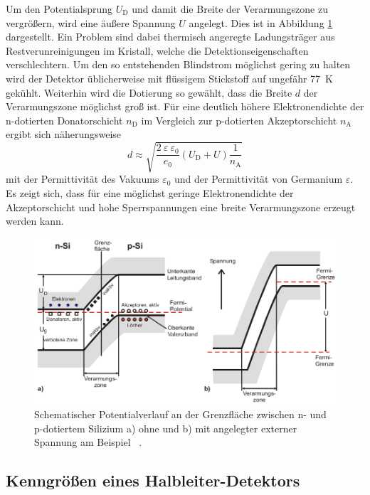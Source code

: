 Um den Potentialsprung $U_\text{D}$ und damit die Breite der Verarmungszone zu vergrößern,
wird eine äußere Spannung $U$ angelegt.
Dies ist in Abbildung \ref{fig:SchematischerPotentialverlauf} dargestellt.
Ein Problem sind dabei thermisch angeregte Ladungsträger aus Restverunreinigungen im Kristall,
welche die Detektionseigenschaften verschlechtern.
Um den so entstehenden Blindstrom möglichst gering zu halten wird der
Detektor üblicherweise mit flüssigem Stickstoff auf ungefähr \SI{77}{\kelvin} gekühlt.
Weiterhin wird die Dotierung so gewählt, dass die Breite $d$ der Verarmungszone möglichst groß ist.
Für eine deutlich höhere Elektronendichte der n-dotierten Donatorschicht $n_\text{D}$ im
Vergleich zur p-dotierten Akzeptorschicht $n_\text{A}$ ergibt sich näherungsweise
\begin{equation}
	d \approx \sqrt{\frac{2\:\varepsilon\:\varepsilon_0}{e_0} \left(U_\text{D} + U\right) \frac{1}{n_\text{A}}}
	\label{eqn:BreiteVerarmungszone}
\end{equation}
mit der Permittivität des Vakuums $\varepsilon_0$ und der Permittivität von Germanium $\varepsilon$.
Es zeigt sich, dass für eine möglichst geringe Elektronendichte der Akzeptorschicht und hohe
Sperrspannungen eine breite Verarmungszone erzeugt werden kann.
\begin{figure}
	\centering
	\includegraphics[width=\textwidth]{images/Schematischer-Potentialverlauf.pdf}
	\caption{Schematischer Potentialverlauf an der Grenzfläche zwischen n- und p-dotiertem
	Silizium a) ohne und b) mit angelegter externer Spannung am Beispiel ~\cite[12]{anleitung}.}
	\label{fig:SchematischerPotentialverlauf}
\end{figure}

\subsection{Kenngrößen eines Halbleiter-Detektors}
\label{sec:KenngroessenHLDetektor}

